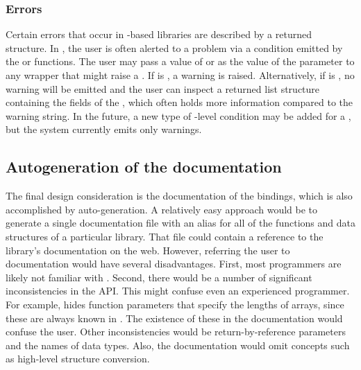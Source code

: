 \documentclass[article,shortnames]{jss}
\begin{document}
\subsubsection{Errors}

Certain errors that occur in -based libraries are described
by a returned  structure. In , the user is
often alerted to a problem via a condition emitted by the
 or  functions.  The user may pass a
value of  or  as the value of the
 parameter to any wrapper that might raise a
.  If  is , a warning is
raised.  Alternatively, if  is , no warning
will be emitted and the user can inspect a returned list structure
containing the fields of the , which often holds more
information compared to the warning string. In the future, a new type
of -level condition may be added for a , but
the system currently emits only warnings.


\subsection{Autogeneration of the documentation}

The final design consideration is the documentation of the bindings,
which is also accomplished by auto-generation. A relatively easy
approach
would be to generate a single documentation file with an alias for all
of
the functions and data structures of a particular library. That file
could
contain a reference to the library's  documentation on the
web. 
However, referring the user to  documentation would have
several disadvantages. First, most  programmers are likely
not
familiar with . Second, there would be a
number of significant inconsistencies in the API. This might confuse
even an experienced  programmer.
For example,  hides function parameters that specify the
lengths of 
arrays, since these are always known in . The existence of
these in 
the  documentation would confuse the  user.
Other 
inconsistencies would be return-by-reference parameters and the names
of data 
types. Also, the  documentation would omit concepts such
as
high-level structure conversion.
\end{document}
